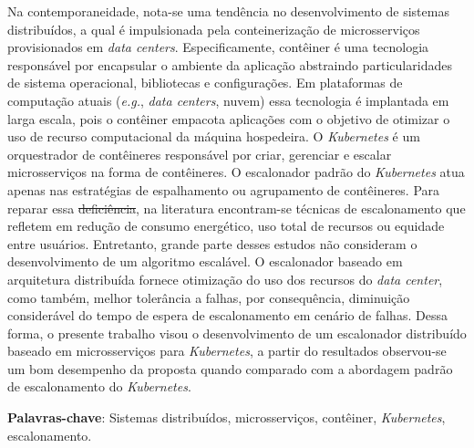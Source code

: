 \documentclass[
	12pt,				%
	openright,			%
	oneside,			%
	a4paper,			%
	brazil				%
	]{abntex2}
\providecommand{\DIFaddtex}[1]{{\protect\color{blue}\uwave{#1}}} %
\providecommand{\DIFdeltex}[1]{{\protect\color{red}\sout{#1}}}                      %
\providecommand{\DIFaddbegin}{} %
\providecommand{\DIFaddend}{} %
\providecommand{\DIFdelbegin}{} %
\providecommand{\DIFdelend}{} %
\providecommand{\DIFadd}[1]{\texorpdfstring{\DIFaddtex{#1}}{#1}} %
\providecommand{\DIFdel}[1]{\texorpdfstring{\DIFdeltex{#1}}{}} %
\newcommand{\DIFscaledelfig}{0.5}
\newlength{\DIFdelgraphicswidth} %
\newlength{\DIFdelgraphicsheight} %
\newcommand{\DIFaddincludegraphics}[2][]{{\color{blue}\fbox{\DIFOincludegraphics[#1]{#2}}}} %
\newcommand{\DIFdelincludegraphics}[2][]{%
\sbox{\DIFdelgraphicsbox}{\DIFOincludegraphics[#1]{#2}}%
\settoboxwidth{\DIFdelgraphicswidth}{\DIFdelgraphicsbox} %
\settoboxtotalheight{\DIFdelgraphicsheight}{\DIFdelgraphicsbox} %
\scalebox{\DIFscaledelfig}{%
\parbox[b]{\DIFdelgraphicswidth}{\usebox{\DIFdelgraphicsbox}\\[-\baselineskip] \rule{\DIFdelgraphicswidth}{0em}}\llap{\resizebox{\DIFdelgraphicswidth}{\DIFdelgraphicsheight}{%
\setlength{\unitlength}{\DIFdelgraphicswidth}%
\begin{picture}(1,1)%
\thicklines\linethickness{2pt} %
{\color[rgb]{1,0,0}\put(0,0){\framebox(1,1){}}}%
{\color[rgb]{1,0,0}\put(0,0){\line( 1,1){1}}}%
{\color[rgb]{1,0,0}\put(0,1){\line(1,-1){1}}}%
\end{picture}%
}\hspace*{3pt}}} %
} %
\DeclareRobustCommand{\DIFaddbegin}{\DIFOaddbegin \let\includegraphics\DIFaddincludegraphics} %
\DeclareRobustCommand{\DIFaddend}{\DIFOaddend \let\includegraphics\DIFOincludegraphics} %
\DeclareRobustCommand{\DIFdelbegin}{\DIFOdelbegin \let\includegraphics\DIFdelincludegraphics} %
\DeclareRobustCommand{\DIFdelend}{\DIFOaddend \let\includegraphics\DIFOincludegraphics} %
\begin{document}
\setlength{\absparsep}{18pt} %
\begin{resumo}
    Na contemporaneidade, nota-se uma tendência no desenvolvimento de sistemas distribuídos, a qual é impulsionada pela conteinerização de microsserviços provisionados em \textit{data centers}. Especificamente, contêiner é uma tecnologia responsável por encapsular o ambiente da aplicação abstraindo particularidades de sistema operacional, bibliotecas e configurações. Em plataformas de computação atuais (\textit{e.g.}, \textit{data centers}, nuvem) essa tecnologia é implantada em larga escala, pois o contêiner empacota aplicações com o objetivo de otimizar o uso de recurso computacional da máquina hospedeira. O \textit{Kubernetes} é um orquestrador de contêineres responsável por criar, gerenciar e escalar microsserviços na forma de contêineres. O escalonador padrão do \textit{Kubernetes} atua apenas nas estratégias de espalhamento ou agrupamento de contêineres. Para reparar essa \DIFdelbegin \DIFdel{deficiência}\DIFdelend \DIFaddbegin \DIFadd{limitação}\DIFaddend , na literatura encontram-se técnicas de escalonamento que refletem em redução de consumo energético, uso total de recursos ou equidade entre usuários. Entretanto, grande parte desses estudos não consideram o desenvolvimento de um algoritmo escalável. O escalonador baseado em arquitetura distribuída fornece otimização do uso dos recursos do \textit{data center}, como também, melhor tolerância a falhas, por consequência, diminuição considerável do tempo de espera de escalonamento em cenário de falhas. Dessa forma, o presente trabalho visou o desenvolvimento de um escalonador distribuído baseado em microsserviços para \textit{Kubernetes}, a partir do resultados observou-se um bom desempenho da proposta quando comparado com a abordagem padrão de escalonamento do \textit{Kubernetes}.

    \textbf{Palavras-chave}: Sistemas distribuídos, microsserviços, contêiner, \textit{Kubernetes}, escalonamento.
\end{resumo}
\end{document}

